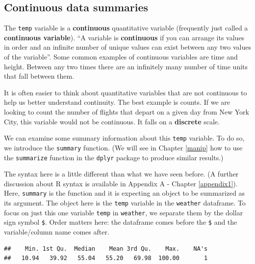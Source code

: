 \documentclass[]{tufte-book}
\newenvironment{Shaded}{\begin{snugshade}}{\end{snugshade}}
\newcommand{\KeywordTok}[1]{\textcolor[rgb]{0.13,0.29,0.53}{\textbf{{#1}}}}
\newcommand{\NormalTok}[1]{{#1}}
\begin{document}
\subsection{Continuous data summaries}\label{continuous-data-summaries}

The \texttt{temp} variable is a \textbf{continuous} quantitative
variable (frequently just called a \textbf{continuous variable}). ``A
variable is \textbf{continuous} if you can arrange its values in order
and an infinite number of unique values can exist between any two values
of the variable''\citep{r4ds2016}. Some common examples of continuous
variables are time and height. Between any two times there are an
infinitely many number of time units that fall between them.

It is often easier to think about quantitative variables that are not
continuous to help us better understand continuity. The best example is
counts. If we are looking to count the number of flights that depart on
a given day from New York City, this variable would not be continuous.
It falls on a \textbf{discrete} scale.

We can examine some summary information about this \texttt{temp}
variable. To do so, we introduce the \texttt{summary} function. (We will
see in Chapter \ref{manip} how to use the \texttt{summarize} function in
the \texttt{dplyr} package to produce similar results.)

The syntax here is a little different than what we have seen before. (A
further discussion about R syntax is available in Appendix A - Chapter
\ref{appendix1}). Here, \texttt{summary} is the function and it is
expecting an object to be summarized as its argument. The object here is
the \texttt{temp} variable in the \texttt{weather} dataframe. To focus
on just this one variable \texttt{temp} in \texttt{weather}, we separate
them by the dollar sign symbol \texttt{\$}. Order matters here: the
dataframe comes before the \texttt{\$} and the variable/column name
comes after.

\begin{Shaded}
\end{Shaded}

\begin{verbatim}
##    Min. 1st Qu.  Median    Mean 3rd Qu.    Max.    NA's 
##   10.94   39.92   55.04   55.20   69.98  100.00       1
\end{verbatim}
\end{document}

